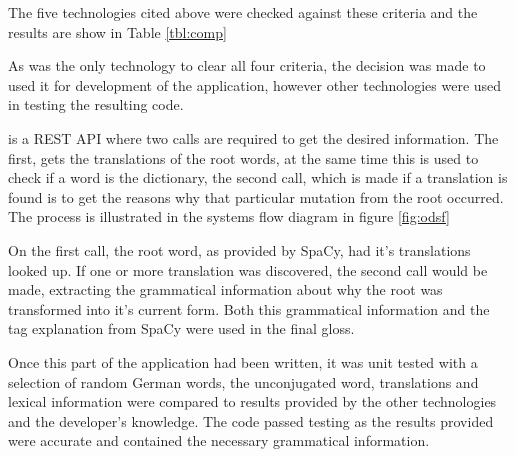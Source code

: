 	The five technologies cited above were checked against these criteria and the results are show in Table \ref{tbl:comp}
	
	
	
	As \textcite{oxford} was the only technology to clear all four criteria, the decision was made to used it for development of the application, however other technologies were used in testing the resulting code.
	
	\textcite{oxford} is a REST API where two calls are required to get the desired information. The first, gets the translations of the root words, at the same time this is used to check if a word is the dictionary, the second call, which is made if a translation is found is to get the reasons why that particular mutation from the root occurred.  The process is illustrated in the systems flow diagram in figure \ref{fig:odsf}
	
	
	
	On the first call, the root word, as provided by SpaCy, had it's translations looked up. If one or more translation was discovered, the second call would be made, extracting the grammatical information about why the root was transformed into it's current form. Both this grammatical information and the tag explanation from SpaCy were used in the final gloss.
	
	Once this part of the application had been written, it was unit tested with a selection of random German words, the unconjugated word, translations and lexical information were compared to results provided by the other technologies and the developer's knowledge. The code passed testing as the results provided were accurate and contained the necessary grammatical information. 
	